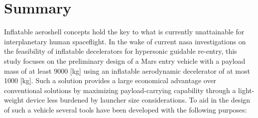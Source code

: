 \section*{Summary}\label{cha:summary}
Inflatable aeroshell concepts hold the key to what is currently unattainable for interplanetary human spaceflight. In the wake of current \acrshort{nasa} investigations on the feasibility of inflatable decelerators for hypersonic guidable re-entry, this study focuses on the preliminary design of a Mars entry vehicle with a payload mass of at least 9000 [kg] using an inflatable aerodynamic decelerator of at most 1000 [kg]. Such a solution provides a large economical advantage over conventional solutions by maximizing payload-carrying capability through a light-weight device less burdened by launcher size considerations.
\newline
\newline
To aid in the design of such a vehicle several tools have been developed with the following purposes:

